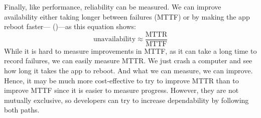Finally, like performance, reliability can be measured.  We can improve availability either taking longer between failures (MTTF) or by making the app reboot faster--- ()---as this equation shows:
\begin{equation}
    \mbox{unavailability} \approx \frac{\mbox{MTTR}}{\mbox{MTTF}}
\end{equation}
While it is hard to measure improvements in MTTF, as it can take a long time to record failures, we can easily measure MTTR. We just crash a computer and see how long it takes the app to reboot. And what we can measure, we can improve. Hence, it may be much more cost-effective to try to improve MTTR than to improve MTTF since it is easier to measure progress. However, they are not mutually exclusive, so developers can try to increase dependability by following both paths.
